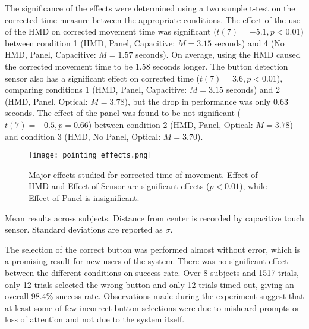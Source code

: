 The significance of the effects were determined using a two sample t-test on the corrected time measure between the appropriate conditions.
The effect of the use of the HMD on corrected movement time was significant ($t(7)=-5.1, p < 0.01$) between condition 1 (HMD, Panel, Capacitive: $M=3.15$ seconds) and 4 (No HMD, Panel, Capacitive: $M=1.57$ seconds).
On average, using the HMD caused the corrected movement time to be 1.58 seconds longer.
The button detection sensor also has a significant effect on corrected time ($t(7)=3.6, p < 0.01$), comparing conditions 1 (HMD, Panel, Capacitive: $M=3.15$ seconds) and 2 (HMD, Panel, Optical: $M=3.78$), but the drop in performance was only 0.63 seconds.
The effect of the panel was found to be not significant ($t(7)=-0.5, p=0.66$) between condition 2 (HMD, Panel, Optical: $M=3.78$) and condition 3 (HMD, No Panel, Optical: $M=3.70$).

\begin{figure}
    \centering
    \texttt{[image: pointing\_effects.png]}
    \caption{Major effects studied for corrected time of movement. Effect of HMD and Effect of Sensor are significant effects ($p<0.01$), while Effect of Panel is insignificant.}
    \label{fig:pe_effects}
\end{figure}

\begin{table}
    \centering
    \caption{Mean results across subjects. Distance from center is recorded by capacitive touch sensor. Standard deviations are reported as $\sigma$.}
    \label{tab:pe_results}
\end{table}

The selection of the correct button was performed almost without error, which is a promising result for new users of the system.
There was no significant effect between the different conditions on success rate.
Over 8 subjects and 1517 trials, only 12 trials selected the wrong button and only 12 trials timed out, giving an overall 98.4\% success rate.
Observations made during the experiment suggest that at least some of few incorrect button selections were due to misheard prompts or loss of attention and not due to the system itself.

